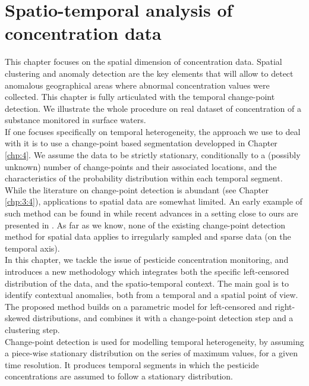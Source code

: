 \chapter{Spatio-temporal analysis of concentration data}\label{chp:5}

\minitoc

\clearpage

This chapter focuses on the spatial dimension of concentration data. Spatial clustering and anomaly detection are the key elements that will allow to detect anomalous geographical areas where abnormal concentration values were collected. This chapter is fully articulated with the temporal change-point detection. We illustrate the whole procedure on real dataset of concentration of a substance monitored in surface waters.      \\
If one focuses specifically on temporal heterogeneity, the approach we use to deal with it is to use a change-point based segmentation developped in Chapter \ref{chp:4}. We assume the data to be strictly stationary, conditionally to a (possibly unknown) number of change-points and their associated locations, and the characteristics of the probability distribution within each temporal segment.
While the literature on change-point detection is abundant (see Chapter \ref{chp:3:4}), applications to spatial data are somewhat limited. An early example of such method can be found in \cite{MAJUMDAR2005149} while recent advances in a setting close to ours are presented in \cite{doi:10.1080/07474946.2020.1826796}. As far as we know, none of the existing change-point detection method for spatial data applies to irregularly sampled and sparse data (on the temporal axis). \\
In this chapter, we tackle the issue of pesticide concentration monitoring, and introduces a new methodology which integrates both the specific left-censored distribution of the data, and the spatio-temporal context. The main goal is to identify contextual anomalies, both from a temporal and a spatial point of view. The proposed method builds on a parametric model for left-censored and right-skewed distributions, and combines it with a change-point detection step and a clustering step.\\
Change-point detection is used for modelling temporal heterogeneity, by assuming a piece-wise stationary distribution on the series of maximum values, for a given time resolution. It produces temporal segments in which the pesticide concentrations are assumed to follow a stationary distribution. \\

